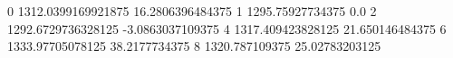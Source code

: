 0 1312.0399169921875 16.2806396484375
1 1295.75927734375 0.0
2 1292.6729736328125 -3.0863037109375
4 1317.409423828125 21.650146484375
6 1333.97705078125 38.2177734375
8 1320.787109375 25.02783203125
